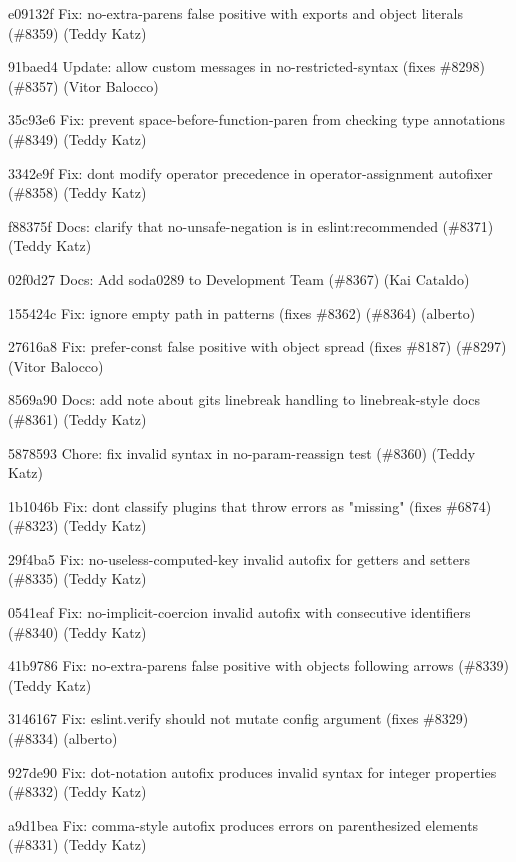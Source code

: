 \begin{DoxyItemize}
\item e09132f Fix\+: no-\/extra-\/parens false positive with exports and object literals (\#8359) (Teddy Katz)
\item 91baed4 Update\+: allow custom messages in no-\/restricted-\/syntax (fixes \#8298) (\#8357) (Vitor Balocco)
\item 35c93e6 Fix\+: prevent space-\/before-\/function-\/paren from checking type annotations (\#8349) (Teddy Katz)
\item 3342e9f Fix\+: don\textquotesingle{}t modify operator precedence in operator-\/assignment autofixer (\#8358) (Teddy Katz)
\item f88375f Docs\+: clarify that no-\/unsafe-\/negation is in eslint\+:recommended (\#8371) (Teddy Katz)
\item 02f0d27 Docs\+: Add soda0289 to Development Team (\#8367) (Kai Cataldo)
\item 155424c Fix\+: ignore empty path in patterns (fixes \#8362) (\#8364) (alberto)
\item 27616a8 Fix\+: prefer-\/const false positive with object spread (fixes \#8187) (\#8297) (Vitor Balocco)
\item 8569a90 Docs\+: add note about git\textquotesingle{}s linebreak handling to linebreak-\/style docs (\#8361) (Teddy Katz)
\item 5878593 Chore\+: fix invalid syntax in no-\/param-\/reassign test (\#8360) (Teddy Katz)
\item 1b1046b Fix\+: don\textquotesingle{}t classify plugins that throw errors as "{}missing"{} (fixes \#6874) (\#8323) (Teddy Katz)
\item 29f4ba5 Fix\+: no-\/useless-\/computed-\/key invalid autofix for getters and setters (\#8335) (Teddy Katz)
\item 0541eaf Fix\+: no-\/implicit-\/coercion invalid autofix with consecutive identifiers (\#8340) (Teddy Katz)
\item 41b9786 Fix\+: no-\/extra-\/parens false positive with objects following arrows (\#8339) (Teddy Katz)
\item 3146167 Fix\+: {\ttfamily eslint.\+verify} should not mutate config argument (fixes \#8329) (\#8334) (alberto)
\item 927de90 Fix\+: dot-\/notation autofix produces invalid syntax for integer properties (\#8332) (Teddy Katz)
\item a9d1bea Fix\+: comma-\/style autofix produces errors on parenthesized elements (\#8331) (Teddy Katz)

\end{DoxyItemize}
